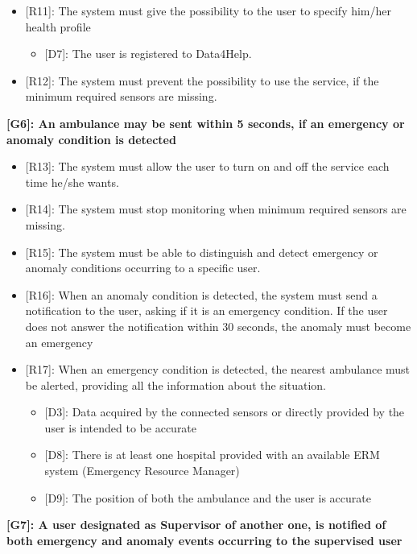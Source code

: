\begin{itemize}
	\item {[R11]: The system must give the possibility to the user to specify him/her health profile}
	\begin{itemize}
		\item {[D7]: The user is registered to Data4Help.}
	\end{itemize} 
	\item {[R12]: The system must prevent the possibility to use the service, if the minimum required sensors are missing.}
\end{itemize}

\textbf{[G6]: An ambulance may be sent within 5 seconds, if an emergency or anomaly condition is detected}

\begin{itemize}
	\item {[R13]: The system must allow the user to turn on and off the service each time he/she wants.}
	\item {[R14]: The system must stop monitoring when minimum required sensors are missing.}
	\item {[R15]: The system must be able to distinguish and detect emergency or anomaly conditions occurring to a specific user.}
	\item {[R16]: When an anomaly condition is detected, the system must send a notification to the user, asking if it is an emergency condition. If the user does not answer the notification within 30 seconds, the anomaly must become an emergency }
	\item {[R17]: When an emergency condition is detected, the nearest ambulance must be alerted, providing all the information about the situation.}
	\begin{itemize}
		\item {[D3]: Data acquired by the connected sensors or directly provided by the user is intended to be accurate}
		\item {[D8]: There is at least one hospital provided with an available ERM system (Emergency Resource Manager)} 
		\item {[D9]: The position of both the ambulance and the user is accurate}
	\end{itemize}
\end{itemize}
\raggedbottom
\textbf{[G7]: A user designated as Supervisor of another one, is notified of both emergency and anomaly events occurring to the supervised user}

